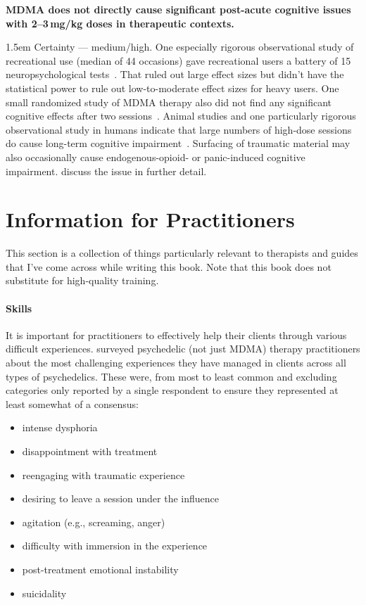\documentclass[11pt,oneside]{book}
\let\cite\parencite
\newcommand{\claim}[2]{%
    \par\medskip\noindent\textbf{#1}%
    \begin{adjustwidth}{1.5em}{}%
    \setlength{\parindent}{0pt}%
    \setlength{\parskip}{0.5\baselineskip}%
    #2%
    \end{adjustwidth}%
}
\begin{document}
\claim{MDMA does not directly cause significant post-acute cognitive issues with 2--3\,mg/kg doses in therapeutic contexts.}{Certainty --- medium/high. One especially rigorous observational study of recreational use (median of 44 occasions) gave recreational users a battery of 15 neuropsychological tests~\cite{halpernMormonRavers}. That ruled out large effect sizes but didn't have the statistical power to rule out low-to-moderate effect sizes for heavy users. One small randomized study of MDMA therapy also did not find any significant cognitive effects after two sessions~\cite{mithoeferSafety}. Animal studies and one particularly rigorous observational study in humans indicate that large numbers of high-dose sessions do cause long-term cognitive impairment~\cite{corayMemory}. Surfacing of traumatic material may also occasionally cause endogenous-opioid- or panic-induced cognitive impairment. \textcite{wolfgang2025,passieHistory} discuss the issue in further detail.}

\chapter{Information for Practitioners}
\label{practitionerSkills}
This section is a collection of things particularly relevant to therapists and guides that I've come across while writing this book. Note that this book does not substitute for high-quality training.

\subsubsection*{Skills}
It is important for practitioners to effectively help their clients through various difficult experiences. \textcite{bender2025provider} surveyed psychedelic (not just MDMA) therapy practitioners about the most challenging experiences they have managed in clients across all types of psychedelics. These were, from most to least common and excluding categories only reported by a single respondent to ensure they represented at least somewhat of a consensus:
\begin{itemize}
    \item intense dysphoria
    \item disappointment with treatment
    \item reengaging with traumatic experience
    \item desiring to leave a session under the influence
    \item agitation (e.g., screaming, anger)
    \item difficulty with immersion in the experience
    \item post-treatment emotional instability
    \item suicidality
\end{itemize}
\end{document}
